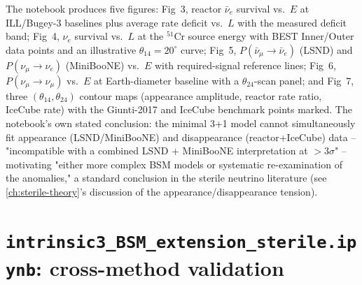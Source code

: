 The notebook produces five figures: Fig~3, reactor $\bar\nu_e$ survival
vs.\ $E$ at ILL/Bugey-3 baselines plus average rate deficit vs.\ $L$ with
the measured deficit band; Fig~4, $\nu_e$ survival vs.\ $L$ at the $^{51}$Cr
source energy with BEST Inner/Outer data points and an illustrative
$\theta_{14}=20^\circ$ curve; Fig~5, $P(\bar\nu_\mu\to\bar\nu_e)$ (LSND) and
$P(\nu_\mu\to\nu_e)$ (MiniBooNE) vs.\ $E$ with required-signal reference
lines; Fig~6, $P(\nu_\mu\to\nu_\mu)$ vs.\ $E$ at Earth-diameter baseline
with a $\theta_{24}$-scan panel; and Fig~7, three $(\theta_{14},\theta_{24})$
contour maps (appearance amplitude, reactor rate ratio, IceCube rate) with
the Giunti-2017 and IceCube benchmark points marked. The notebook's own
stated conclusion: the minimal 3+1 model cannot simultaneously fit
appearance (LSND/MiniBooNE) and disappearance (reactor+IceCube) data --
"incompatible with a combined LSND + MiniBooNE interpretation at
$>3\sigma$" -- motivating "either more complex BSM models or systematic
re-examination of the anomalies," a standard conclusion in the sterile
neutrino literature (see \cref{ch:sterile-theory}'s discussion of the
appearance/disappearance tension).

\section{\texttt{intrinsic3\_BSM\_extension\_sterile.ipynb}: cross-method validation}
\label{sec:results-intrinsic3}

